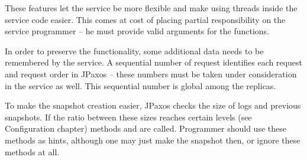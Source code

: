 These features let the service be more flexible and make using threads inside the service code easier. This comes at cost of placing partial responsibility on the service programmer -- he must provide valid arguments for the functions.

In order to preserve the functionality, some additional data needs to be remembered by the service.
A sequential number of request identifies each request and request order in JPaxos -- these numbers must be taken under consideration in the service as well. This sequential number is global among the replicas.

To make the snapshot creation easier, JPaxos checks the size of logs and previous snapshots. If the ratio between these sizes reaches certain levels (see Configuration chapter) methods  and  are called. Programmer should use these methods as hints, although one may just make the snapshot then, or ignore these methods at all.

